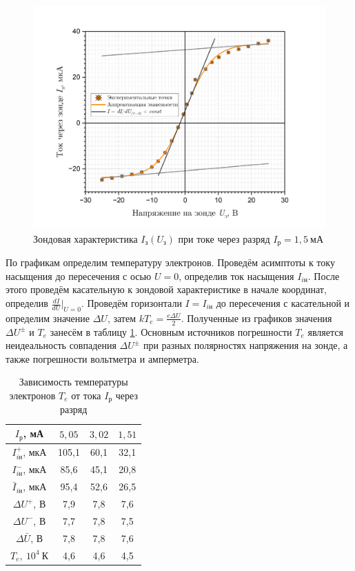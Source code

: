 \documentclass[a4paper, 12pt]{article}
\begin{document}
    \begin{figure}[H]
        \centering
        \includegraphics[width = 14 cm]{images/graph_1_5mA.png}
        \caption{Зондовая характеристика $I_{\text{з}}\left(U_{\text{з}}\right)$ при токе через разряд $I_{\text{р}}= 1,5 ~\text{мА}$}
            \label{graph:probes_1_5}
    \end{figure}
 
    По графикам определим температуру электронов. Проведём асимптоты к току насыщения до пересечения с осью $U = 0$, определив ток насыщения $I_{i\text{н}}$. После этого проведём касательную к зондовой характеристике в начале координат, определив $\frac{dI}{dU} \vert_{U = 0}$. Проведём горизонтали $I = I_{i\text{н}}$ до пересечения с касательной и определим значение $\Delta U$, затем $kT_e = \frac{e \Delta U}{2}$. Полученные из графиков значения $\Delta U^{\pm}$ и $T_e$ занесём в таблицу \ref{table:result_9}. Основным источников погрешности $T_e$ является неидеальность совпадения $\Delta U^{\pm}$ при разных полярностях напряжения на зонде, а также погрешности вольтметра и амперметра.

    \begin{table}[H]
	\centering
	\begin{tabular}{|c|c|c|c|}
		\hline
		$I_{\text{р}}$, мА & $5,05$ & $3,02$ & $1,51$ \\ \hline
		$I_{i\text{н}}^+$, мкА & 105,1 & 60,1 & 32,1 \\ \hline
		$I_{i\text{н}}^-$, мкА & 85,6 & 45,1 & 20,8 \\ \hline
		$\bar{I}_{i\text{н}}$, мкА & 95,4 & 52,6 & 26,5 \\ \hline
		$\Delta U^+$, В & 7,9 & 7,8 & 7,6 \\ \hline
		$\Delta U^-$, В & 7,7 & 7,8 & 7,5 \\ \hline
		$\Delta\bar{U}$, В & 7,8 & 7,8 & 7,6 \\ \hline
		$T_e,\ 10^4~\text{К}$ & 4,6 & 4,6 & 4,5 \\ \hline
	\end{tabular}
        \caption{Зависимость температуры электронов $T_e$ от тока $I_{\text{р}}$ через разряд} 
        \label{table:result_9}
    \end{table}
\end{document}
